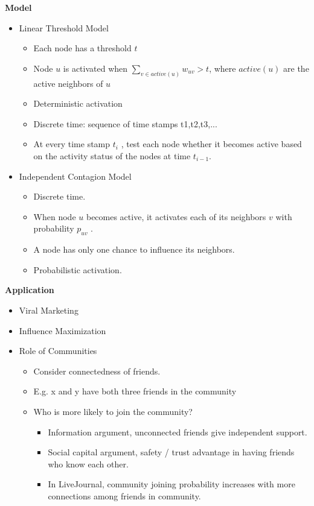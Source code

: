 \documentclass[../notes.tex]{subfiles}
\begin{document}
\textbf{Model}
\begin{itemize}
  \item Linear Threshold Model
  \begin{itemize}
    \item Each node has a threshold $t$
    \item Node $u$ is activated when $\sum_{v \in active(u)} w_{uv} > t$, where $active(u)$ are the active neighbors of $u$
    \item Deterministic activation
    \item Discrete time: sequence of time stamps t1,t2,t3,...
    \item At every time stamp $t_i$ , test each node whether it becomes active based on the activity status of the nodes at time $t_{i-1}$.
  \end{itemize}

  \item Independent Contagion Model
  \begin{itemize}
    \item Discrete time.
    \item When node $u$ becomes active, it activates each of its neighbors $v$ with probability $p_{uv}$ .
    \item A node has only one chance to influence its neighbors.
    \item Probabilistic activation.
  \end{itemize}
\end{itemize}

\textbf{Application}
\begin{itemize}
  \item Viral Marketing
  \item Influence Maximization
  
  \item Role of Communities
  \begin{itemize}
    \item Consider connectedness of friends.
    \item E.g. x and y have both three friends in the community
    \item Who is more likely to join the community?
    \begin{itemize}
      \item Information argument, unconnected friends give independent support.
      \item Social capital argument, safety / trust advantage in having friends who know each other.
      \item In LiveJournal, community joining probability increases with more connections among friends in community.
    \end{itemize}

  \end{itemize}

\end{itemize}
\end{document}
